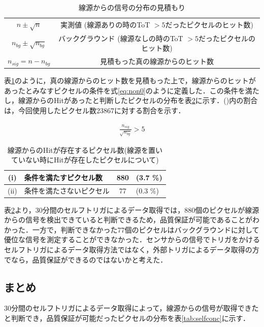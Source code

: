 \begin{table}[h]
  \centering
  \caption{線源からの信号の分布の見積もり}
  \label{tb:selfnon0}
  \begin{tabular}{cc} \hline
    $n \pm \sqrt{n}$ & 実測値  (線源ありの時のToT $>5$だったピクセルのヒット数) \\
    $n_{bg} \pm \sqrt{n_{bg}}$ & バックグラウンド  (線源なしの時のToT $>5$だったピクセルのヒット数)\\
    $n_{sig} = n - n_{bg}$ & 見積もった真の線源からのヒット数 \\ \hline
  \end{tabular}
\end{table}

表\ref{tb:selfnon0}のように，真の線源からのヒット数を見積もった上で，線源からのヒットがあったとみなすピクセルの条件を式\ref{eq:non0}のように定義した．この条件を満たし，線源からのHitがあったと判断したピクセルの分布を表\ref{tab:non0dist}に示す．()内の割合は，今回使用したピクセル数23867に対する割合を示す．

\begin{eqnarray}
  \label{eq:non0}
  \frac{n_{sig}}{\sqrt{n_{bg}}} > 5
\end{eqnarray}

\begin{table}[h]
  \centering
  \caption{線源からのHitが存在するピクセル数(線源を置いていない時にHitが存在したピクセルについて)}
  \begin{tabular}{|cl|cl|} \hline
    (i) & 条件を満たすピクセル数 & 880 & (3.7 \%) \\ \hline
    (ii) & 条件を満たさないピクセル & 77 & (0.3 \%) \\ \hline
  \end{tabular}
  \label{tab:non0dist}
\end{table}

表\ref{tab:non0dist}より，30分間のセルフトリガによるデータ取得では，880個のピクセルが線源からの信号を検出できていると判断できるため，品質保証が可能であることがわかった．一方で，判断できなかった77個のピクセルはバックグラウンドに対して優位な信号を測定することができなかった．センサからの信号でトリガをかけるセルフトリガによるデータ取得方法ではなく，外部トリガによるデータ取得の方でなら，品質保証ができるのではないかと考えた．

\subsection*{まとめ}
30分間のセルフトリガによるデータ取得によって，線源からの信号が取得できたと判断でき，品質保証が可能だったピクセルの分布を表\ref{tab:selfconc}に示す．

